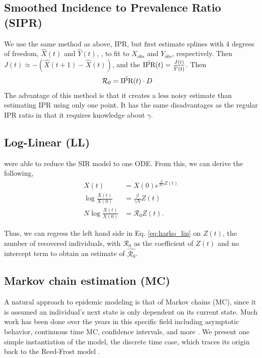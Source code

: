 \documentclass[12pt]{article}
\newcommand{\rr}{\ensuremath{\mathcal{R}_0}}
\begin{document}
\subsection{Smoothed Incidence to Prevalence Ratio (SIPR)}
We use the same method as above, IPR, but first estimate splines with 4 degrees of freedom, $\hat{X}(t)$ and $\hat{Y}(t)$, , to fit to $X_{obs}$ and $Y_{obs}$, respectively.  Then  $J(t) \approx -(\hat{X}(t+1) - \hat{X}(t))$, and the $\hat{\textnormal{IPR}}(t) = \frac{J(t)}{\hat{Y}(t)}$.  Then
\begin{align*}
\rr &= \hat{\textnormal{IPR}}(t) \cdot D
\end{align*}
The advantage of this method is that it creates a less noisy estimate than estimating IPR using only one point.  It has the same disadvantages as the regular IPR ratio in that it requires knowledge about $\gamma$.

\subsection{Log-Linear (LL)}
\cite{harko2014exact} were able to reduce the SIR model to one ODE.  From this, we can derive the following,
\begin{align}
  X(t) &=  X(0) e^{\frac{\beta}{N \gamma}Z(t)} \nonumber\\
  \log \frac{X(t)}{X(0)} &=  \frac{\beta }{\gamma N }Z(t) \nonumber\\
  N\log \frac{X(t)}{X(0)} &=  \rr Z(t). \label{eq:harko_lin}
\end{align}

Thus, we can regress the left hand side in Eq. \ref{eq:harko_lin} on $Z(t)$, the number of recovered individuals, with $\rr$ as the coefficient of $Z(t)$ and no intercept term to obtain an estimate of $\hat{\rr}$.

\subsection{Markov chain estimation (MC)}
A natural approach to epidemic modeling is that of Markov chains (MC), since it is assumed an individual's next state is only dependent on its current state.  Much work has been done over the years in this specific field including asymptotic behavior, continuous time MC, confidence intervals, and more \citep{jacquez1991,gani1995,daley2001epidemic}.  We present one simple instantiation of the model, the discrete time case, which traces its origin back to the Reed-Frost model \citep{abbey1952}.
\end{document}
